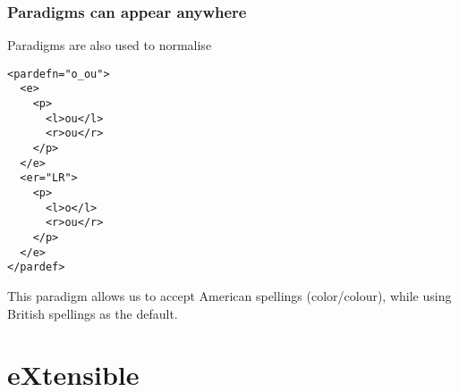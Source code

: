 \documentclass{beamer} %
\begin{document}
\begin{frame}
  \frametitle{Paradigms can appear anywhere}

  \begin{exampleblock}{Paradigms are also used to normalise}
    \begin{footnotesize}
    \begin{alltt}
      <pardef n="o\_ou"> \\
      ~~<e> \\
      ~~~~<p> \\
      ~~~~~~<l>ou</l> \\
      ~~~~~~<r>ou</r> \\
      ~~~~</p> \\
      ~~</e> \\
      ~~<e r="LR"> \\
      ~~~~<p> \\
      ~~~~~~<l>o</l> \\
      ~~~~~~<r>ou</r> \\
      ~~~~</p> \\
      ~~</e> \\
      </pardef>
    \end{alltt}
    \end{footnotesize}
\end{exampleblock}

  This paradigm allows us to accept American spellings (color/colour), while using 
  British spellings as the default.
\end{frame}

\section{eXtensible}
\end{document}
